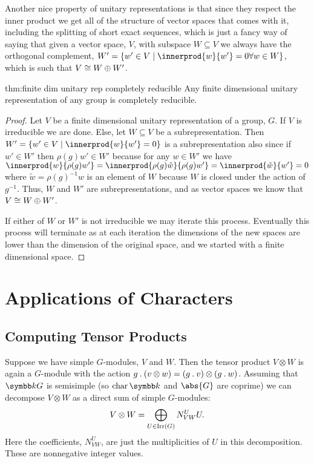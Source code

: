 Another nice property of unitary representations is that since they respect the inner product we get all of the structure of vector spaces that comes with it, including the splitting of short exact sequences, which is just a fancy way of saying that given a vector space, \(V\), with subspace \(W \subseteq V\) we always have the orthogonal complement, \(W' = \{w' \in V \mid \innerprod{w}{w'} = 0 \forall w \in W\}\), which is such that \(V \cong W \oplus W'\).

\begin{thm}{}{thm:finite dim unitary rep completely reducible}
    Any finite dimensional unitary representation of any group is completely reducible.
    \begin{proof}
        Let \(V\) be a finite dimensional unitary representation of a group, \(G\).
        If \(V\) is irreducible we are done.
        Else, let \(W \subseteq V\) be a subrepresentation.
        Then \(W' = \{w' \in V \mid \innerprod{w}{w'} = 0\}\) is a subrepresentation also since if \(w' \in W'\) then \(\rho(g)w' \in W'\) because for any \(w \in W'\) we have \(\innerprod{w}{\rho(g)w'} = \innerprod{\rho(g)\tilde{w}}{\rho(g)w'} = \innerprod{\tilde{w}}{w'} = 0\) where \(\tilde{w} = \rho(g)^{-1}w\) is an element of \(W\) because \(W\) is closed under the action of \(g^{-1}\).
        Thus, \(W\) and \(W'\) are subrepresentations, and as vector spaces we know that \(V \cong W \oplus W'\).
        
        If either of \(W\) or \(W'\) is not irreducible we may iterate this process.
        Eventually this process will terminate as at each iteration the dimensions of the new spaces are lower than the dimension of the original space, and we started with a finite dimensional space.
    \end{proof}
\end{thm}

\chapter{Applications of Characters}
\section{Computing Tensor Products}
Suppose we have simple \(G\)-modules, \(V\) and \(W\).
Then the tensor product \(V \otimes W\) is again a \(G\)-module with the action \(g \mathbin{.} (v \otimes w) = (g \mathbin{.} v) \otimes (g \mathbin{.} w)\).
Assuming that \(\field G\) is semisimple (so \(\Char \field\) and \(\abs{G}\) are coprime) we can decompose \(V \otimes W\) as a direct sum of simple \(G\)-modules:
\begin{equation}
    V \otimes W = \bigoplus_{U \in \operatorname{Irr}(G)} N^U_{VW} U.
\end{equation}
Here the coefficients, \(N^U_{VW}\), are just the multiplicities of \(U\) in this decomposition.
These are nonnegative integer values.

